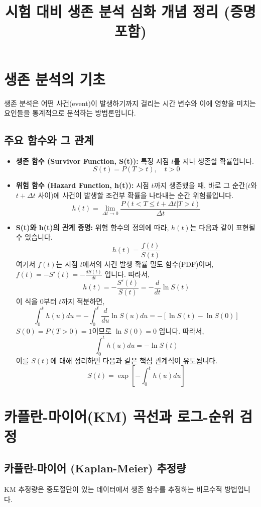\documentclass{article}
\title{시험 대비 생존 분석 심화 개념 정리 (증명 포함)}
\author{}
\date{}
\begin{document}
\maketitle

\section{생존 분석의 기초}

생존 분석은 어떤 사건(event)이 발생하기까지 걸리는 시간 변수와 이에 영향을 미치는 요인들을 통계적으로 분석하는 방법론입니다.

\subsection{주요 함수와 그 관계}

\begin{itemize}
    \item \textbf{생존 함수 (Survivor Function, S(t)):} 특정 시점 $t$를 지나 생존할 확률입니다.
    $$S(t) = P(T > t), \quad t > 0$$

    \item \textbf{위험 함수 (Hazard Function, h(t)):} 시점 $t$까지 생존했을 때, 바로 그 순간($t$와 $t+\Delta t$ 사이)에 사건이 발생할 조건부 확률을 나타내는 순간 위험률입니다.
    $$h(t) = \lim_{\Delta t \to 0} \frac{P(t < T \le t + \Delta t | T > t)}{\Delta t}$$

    \item \textbf{S(t)와 h(t)의 관계 증명:}
    위험 함수의 정의에 따라, $h(t)$는 다음과 같이 표현될 수 있습니다.
    $$h(t) = \frac{f(t)}{S(t)}$$
    여기서 $f(t)$는 시점 $t$에서의 사건 발생 확률 밀도 함수(PDF)이며, $f(t) = -S'(t) = -\frac{dS(t)}{dt}$ 입니다. 따라서,
    $$h(t) = -\frac{S'(t)}{S(t)} = -\frac{d}{dt} \ln S(t)$$
    이 식을 0부터 $t$까지 적분하면,
    $$\int_0^t h(u)du = -\int_0^t \frac{d}{du} \ln S(u)du = -[\ln S(t) - \ln S(0)]$$
    $S(0)=P(T>0)=1$이므로 $\ln S(0)=0$ 입니다. 따라서,
    $$\int_0^t h(u)du = -\ln S(t)$$
    이를 $S(t)$에 대해 정리하면 다음과 같은 핵심 관계식이 유도됩니다.
    $$S(t) = \exp\left[-\int_0^t h(u)du\right]$$
\end{itemize}

\section{카플란-마이어(KM) 곡선과 로그-순위 검정}

\subsection{카플란-마이어 (Kaplan-Meier) 추정량}
KM 추정량은 중도절단이 있는 데이터에서 생존 함수를 추정하는 비모수적 방법입니다.
\end{document}
